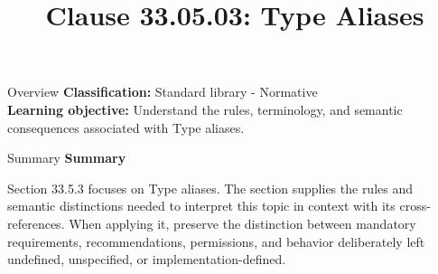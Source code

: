\documentclass[10pt,letterpaper]{article}
\title{Clause 33.05.03: Type Aliases}
\author{}
\date{}
\begin{document}
\maketitle
\begin{CornellOverviewBox}{Overview}
\textbf{Classification:} Standard library - Normative\\[2pt]
\textbf{Learning objective:} Understand the rules, terminology, and semantic consequences associated with Type aliases.
\end{CornellOverviewBox}\begin{CornellSummaryBox}{Summary}
{\sffamily\bfseries\color{Accent} Summary}\par\vspace{3pt}Section 33.5.3 focuses on Type aliases. The section supplies the rules and semantic distinctions needed to interpret this topic in context with its cross-references. When applying it, preserve the distinction between mandatory requirements, recommendations, permissions, and behavior deliberately left undefined, unspecified, or implementation-defined.
\end{CornellSummaryBox}
\end{document}

